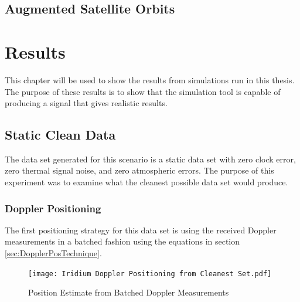 \documentclass[12pt]{report}
\begin{document}
\section{Augmented Satellite Orbits}

\chapter{Results}

This chapter will be used to show the results from simulations run in this thesis. The purpose of these results is to show that the simulation tool is capable of producing a signal that gives realistic results. 

\section{Static Clean Data}
The data set generated for this scenario is a static data set with zero clock error, zero thermal signal noise, and zero atmospheric errors. The purpose of this experiment was to examine what the cleanest possible data set would produce.  
\subsection{Doppler Positioning}
The first positioning strategy for this data set is using the received Doppler measurements in a batched fashion using the equations in section \ref{sec:DopplerPosTechnique}. 
\begin{figure}[h!]
    \centering
    \texttt{[image: Iridium Doppler Positioning from Cleanest Set.pdf]}
    \caption{Position Estimate from Batched Doppler Measurements}
    \label{fig:cleaniriddopgeo}
\end{figure}
\end{document}
